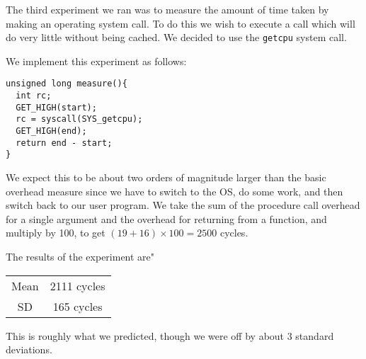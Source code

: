 The third experiment we ran was to measure the amount of time taken by making an operating system call.
To do this we wish to execute a call which will do very little without being cached.  
We decided to use the {\tt getcpu} system call.

We implement this experiment as follows: 
\begin{verbatim}
unsigned long measure(){
  int rc;
  GET_HIGH(start);
  rc = syscall(SYS_getcpu);
  GET_HIGH(end);
  return end - start;
}
\end{verbatim}

We expect this to be about two orders of magnitude larger than the basic overhead measure since we have to switch to the OS, do some work, and then switch back to our user program.  We take the sum of the procedure call overhead for a single argument and the overhead for returning from a function, and multiply by 100, to get $(19+16) \times 100 = 2500$ cycles.

The results of the experiment are"

\begin{table}[h]
\centering
\begin{tabular}{|c|c|}\hline
Mean & 2111 cycles \\
SD & 165 cycles\\\hline
\end{tabular}
\end{table}

This is roughly what we predicted, though we were off by about 3 standard deviations.